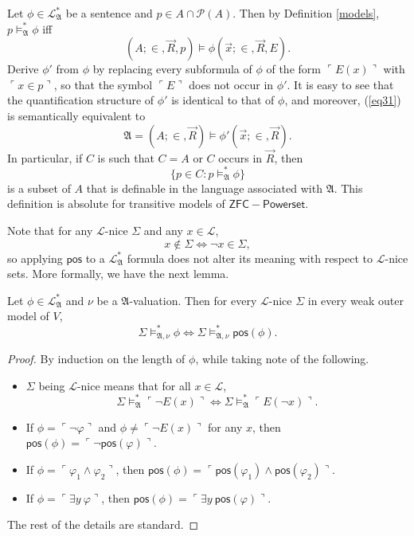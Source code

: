 \documentclass[12pt]{article}
\numberwithin{equation}{section}
\begin{document}
\begin{rem}\label{def2}
Let $\phi \in \mathcal{L}^{*}_{\mathfrak{A}}$ be a sentence and $p \in A \cap \mathcal{P}(A)$. Then by Definition \ref{models}, $p \models^*_{\mathfrak{A}} \phi$ iff 
\begin{equation}\label{eq31}
    (A; \in, \Vec{R}, p) \models \phi(\Vec{x}; \in, \Vec{R}, E).
\end{equation}
Derive $\phi'$ from $\phi$ by replacing every subformula of $\phi$ of the form $\ulcorner E(x) \urcorner$ with $\ulcorner x \in p \urcorner$, so that the symbol $\ulcorner E \urcorner$ does not occur in $\phi'$. It is easy to see that the quantification structure of $\phi'$ is identical to that of $\phi$, and moreover, (\ref{eq31}) is semantically equivalent to $$\mathfrak{A} = (A; \in, \Vec{R}) \models \phi'(\Vec{x}; \in, \Vec{R}).$$ In particular, if $C$ is such that $C = A$ or $C$ occurs in $\Vec{R}$, then $$\{p \in C : p \models^*_{\mathfrak{A}} \phi\}$$ is a subset of $A$ that is definable in the language associated with $\mathfrak{A}$. This definition is absolute for transitive models of $\mathsf{ZFC - Powerset}$.
\end{rem}

Note that for any $\mathcal{L}$-nice $\Sigma$ and any $x \in \mathcal{L}$, $$x \not\in \Sigma \iff \neg x \in \Sigma,$$ so applying $\mathsf{pos}$ to a $\mathcal{L}^{*}_{\mathfrak{A}}$ formula does not alter its meaning with respect to $\mathcal{L}$-nice sets. More formally, we have the next lemma.

\begin{lem}\label{corr}
Let $\phi \in \mathcal{L}^{*}_{\mathfrak{A}}$ and $\nu$ be a $\mathfrak{A}$-valuation. Then for every $\mathcal{L}$-nice $\Sigma$ in every weak outer model of $V$, $$\Sigma \models^*_{\mathfrak{A}, \nu} \phi \iff \Sigma \models^*_{\mathfrak{A}, \nu} \mathsf{pos}(\phi).$$
\end{lem}

\begin{proof}
By induction on the length of $\phi$, while taking note of the following.
\begin{itemize}
    \item $\Sigma$ being $\mathcal{L}$-nice means that for all $x \in \mathcal{L}$, $$\Sigma \models^*_{\mathfrak{A}} \ulcorner \neg E(x) \urcorner \iff \Sigma \models^*_{\mathfrak{A}} \ulcorner E(\neg x) \urcorner.$$ 
    \item If $\phi = \ulcorner \neg \varphi \urcorner$ and $\phi \neq \ulcorner \neg E(x) \urcorner$ for any $x$, then $\mathsf{pos}(\phi) = \ulcorner \neg \mathsf{pos}(\varphi) \urcorner$.
    \item If $\phi = \ulcorner \varphi_1 \wedge \varphi_2 \urcorner$, then $\mathsf{pos}(\phi) = \ulcorner \mathsf{pos}(\varphi_1) \wedge \mathsf{pos}(\varphi_2) \urcorner$.
    \item If $\phi = \ulcorner \exists y \ \varphi \urcorner$, then $\mathsf{pos}(\phi) = \ulcorner \exists y \ \mathsf{pos}(\varphi) \urcorner$.
\end{itemize}
The rest of the details are standard.
\end{proof}
\end{document}
